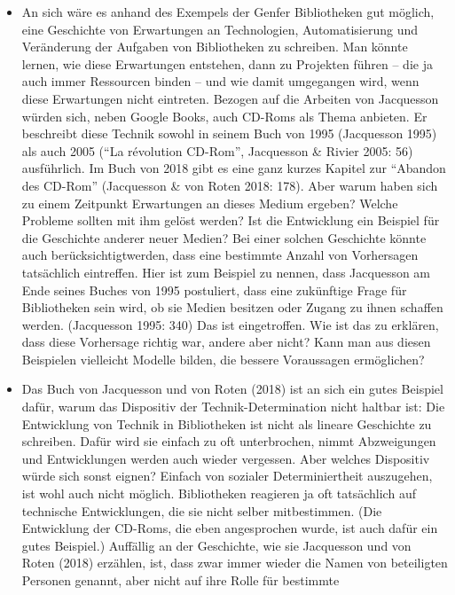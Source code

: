 \documentclass[a4paper,
fontsize=11pt,
oneside,
numbers=noperiodatend,
parskip=half-,
bibliography=totoc,
final
]{scrartcl}
\begin{document}
\begin{itemize}
\item
  An sich wäre es anhand des Exempels der Genfer Bibliotheken gut
  möglich, eine Geschichte von Erwartungen an Technologien,
  Automatisierung und Veränderung der Aufgaben von Bibliotheken zu
  schreiben. Man könnte lernen, wie diese Erwartungen entstehen, dann zu
  Projekten führen -- die ja auch immer Ressourcen binden -- und wie
  damit umgegangen wird, wenn diese Erwartungen nicht eintreten. Bezogen
  auf die Arbeiten von Jacquesson würden sich, neben Google Books, auch
  CD-Roms als Thema anbieten. Er beschreibt diese Technik sowohl in
  seinem Buch von 1995 (Jacquesson 1995) als auch 2005 (\enquote{La
  révolution CD-Rom}, Jacquesson \& Rivier 2005: 56) ausführlich. Im
  Buch von 2018 gibt es eine ganz kurzes Kapitel zur \enquote{Abandon
  des CD-Rom} (Jacquesson \& von Roten 2018: 178). Aber warum haben sich
  zu einem Zeitpunkt Erwartungen an dieses Medium ergeben? Welche
  Probleme sollten mit ihm gelöst werden? Ist die Entwicklung ein
  Beispiel für die Geschichte anderer neuer Medien? Bei einer solchen
  Geschichte könnte auch berücksichtigtwerden, dass eine bestimmte
  Anzahl von Vorhersagen tatsächlich eintreffen. Hier ist zum Beispiel
  zu nennen, dass Jacquesson am Ende seines Buches von 1995 postuliert,
  dass eine zukünftige Frage für Bibliotheken sein wird, ob sie Medien
  besitzen oder Zugang zu ihnen schaffen werden. (Jacquesson 1995: 340)
  Das ist eingetroffen. Wie ist das zu erklären, dass diese Vorhersage
  richtig war, andere aber nicht? Kann man aus diesen Beispielen
  vielleicht Modelle bilden, die bessere Voraussagen ermöglichen?
\item
  Das Buch von Jacquesson und von Roten (2018) ist an sich ein gutes
  Beispiel dafür, warum das Dispositiv der Technik-Determination nicht
  haltbar ist: Die Entwicklung von Technik in Bibliotheken ist nicht als
  lineare Geschichte zu schreiben. Dafür wird sie einfach zu oft
  unterbrochen, nimmt Abzweigungen und Entwicklungen werden auch wieder
  vergessen. Aber welches Dispositiv würde sich sonst eignen? Einfach
  von sozialer Determiniertheit auszugehen, ist wohl auch nicht möglich.
  Bibliotheken reagieren ja oft tatsächlich auf technische
  Entwicklungen, die sie nicht selber mitbestimmen. (Die Entwicklung der
  CD-Roms, die eben angesprochen wurde, ist auch dafür ein gutes
  Beispiel.) Auffällig an der Geschichte, wie sie Jacquesson und von
  Roten (2018) erzählen, ist, dass zwar immer wieder die Namen von
  beteiligten Personen genannt, aber nicht auf ihre Rolle für bestimmte

\end{itemize}
\end{document}
